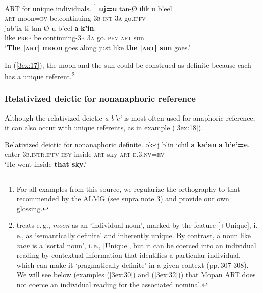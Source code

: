 \documentclass[output=paper]{langsci/langscibook}
\begin{document}
\begin{exe}
\ex\label{3ex:17}
ART for unique individuals. \footnote{For all examples from this source, we regularize the orthography to that recommended by the ALMG (see supra note 3) and provide our own glossing.} 
\exi{}
	{\textbf{uj=u}}			tan-{\O}				ilik 		u   		b'eel  \\
	{\textsc{art}}	moon={\textsc{ev}}		be.continuing-{\textsc{3b}}	{\textsc{int}}	{\textsc{3a}}	go{\textsc{.ipfv}} \\
\glt
\exi{}
\gll	jab'ix	ti 			tan-{\O}					u		b'eel 		{\textbf{a}}	{\textbf{k'in}}. 	 \\
	like	{\textsc{prep}}		be.continuing-{\textsc{3b}}		{\textsc{3a}}	go.{\textsc{ipfv}}	{\textsc{art}}	sun \\
\glt	`{\textbf{The [{\textsc{art}}] moon}} goes along just like {\textbf{the [{\textsc{art}}] sun}} goes.'
\end{exe}

In (\ref{3ex:17}), the moon and the sun could be construed as definite because each has a unique referent.\footnote{\cite[][282]{lobner:11} treats e.\,g., {\emph{moon}} as an `individual noun', marked by the feature [+Unique], i.\,e., as `semantically definite' and inherently unique.  By contrast, a noun like {\emph{man}} is a `sortal noun', i.\,e., [\minus Unique], but it can be coerced into an individual reading by contextual information that identifies a particular individual, which can make it `pragmatically definite' in a given context (pp.\,307-308). We will see below (examples (\ref{3ex:30}) and (\ref{3ex:32})) that Mopan ART does not coerce an individual reading for the associated nominal. }


\subsubsection{Relativized deictic for nonanaphoric reference}\label{3sec:322}

Although the relativized deictic {\emph{a b'e'}} is most often used for anaphoric reference, it can also occur with unique referents, as in example (\ref{3ex:18}).


\begin{exe}
\ex\label{3ex:18}
Relativized deictic for nonanaphoric definite. 
\exi{}
\gll	ok-ij 						b'in 			ichil 		{\textbf{a}} 	{\textbf{ka'an}} 	{\textbf{a}} 	{\textbf{b'e'=e}}. \\
	enter-{\textsc{3b.intr.ipfv}}		{\textsc{hsy}}		inside	{\textsc{art}}	sky			{\textsc{art}}	{\textsc{d.3.nv=ev}} \\
\glt 	`He went inside {\textbf{that sky}}.'
\end{exe}
\end{document}
